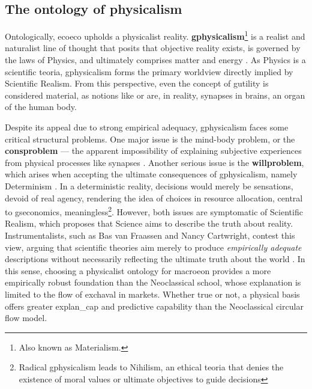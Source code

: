 \documentclass[./main_en.tex]{subfiles}
\begin{document}
\subsection{The ontology of physicalism} \label{subsec:physicalism}

\par Ontologically, \gls{ecoeco} upholds a physicalist reality. \textbf{\gls{gphysicalism}}\footnote{Also known as Materialism.} is a realist and naturalist line of thought that posits that objective reality exists, is governed by the laws of Physics, and ultimately comprises matter and energy \cite{sep-physicalism}. As Physics is a scientific \gls{teoria}, \gls{gphysicalism} forms the primary worldview directly implied by Scientific Realism. From this perspective, even the concept of \gls{gutility} is considered material, as notions like  or  are, in reality, synapses in brains, an organ of the human body.

\par Despite its appeal due to strong empirical adequacy, \gls{gphysicalism} faces some critical structural problems. One major issue is the mind-body problem, or the \textbf{\gls{consproblem}} — the apparent impossibility of explaining subjective experiences from physical processes like synapses \cite{sep-consciousness}. Another serious issue is the \textbf{\gls{willproblem}}, which arises when accepting the ultimate consequences of \gls{gphysicalism}, namely Determinism \cite{sep-skepticism}. In a deterministic reality, decisions would merely be sensations, devoid of real agency, rendering the idea of choices in resource allocation, central to \gls{gseconomics}, meaningless\footnote{Radical \gls{gphysicalism} leads to Nihilism, an ethical \gls{teoria} that denies the existence of moral values or ultimate objectives to guide decisions}. However, both issues are symptomatic of Scientific Realism, which proposes that Science aims to describe the truth about reality. Instrumentalists, such as Bas van Fraassen and Nancy Cartwright, contest this view, arguing that scientific theories aim merely to produce \textit{empirically adequate} descriptions without necessarily reflecting the ultimate truth about the world \cite{bas1980, nancy1983}. In this sense, choosing a physicalist ontology for \gls{macroeon} provides a more empirically robust foundation than the Neoclassical school, whose explanation is limited to the flow of \gls{exchaval} in markets. Whether true or not, a physical basis offers greater \gls{explan_cap} and predictive capability than the Neoclassical circular flow \gls{model}.
\end{document}
